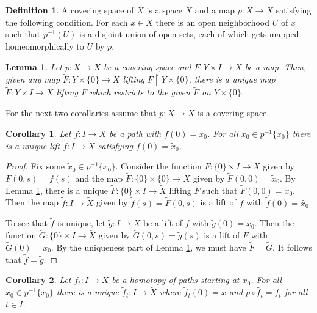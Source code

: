 \documentclass{report}
\newtheorem{lemma}{Lemma}[section]
\newtheorem{corollary}{Corollary}[section]
\theoremstyle{definition}
\newtheorem{definition}{Definition}[section]
\theoremstyle{remark}
\newcommand{\set}[1]{\{#1\}}
\begin{document}
\begin{definition}
   A covering space of $X$ is a space $\widetilde{X}$ and a map $p : \widetilde{X} \to X$ satisfying the following condition. For each $x \in X$ there is an open neighborhood $U$ of $x$ such that $p^{-1}(U)$ is a disjoint union of open sets, each of which gets mapped homeomorphically to $U$ by $p$.
\end{definition}

\begin{lemma} \label{lem_lift_of_covering}
    Let $p : \widetilde{X} \to X$ be a covering space and $F : Y \times I \to X$ be a map. Then, given any map $\widetilde{F} : Y \times \set{0} \to X$ lifting $F \restriction{Y \times \set{0}}$, there is a unique map $\widetilde{F} : Y \times I \to X$ lifting $F$ which restricts to the given $\widetilde{F}$ on $Y \times \set{0}$.
\end{lemma}

For the next two corollaries assume that $p : \tilde{X} \to X$ is a covering space.

\begin{corollary} \label{cor_lift_path}
    Let $f : I \to X$ be a path with $f(0) = x_0$. For all $\tilde{x}_0 \in p^{-1}\set{x_0}$ there is a unique lift $\tilde{f} : I \to \tilde{X}$ satisfying $\tilde{f}(0) = \tilde{x}_0$.
\end{corollary}

\begin{proof}
    Fix some $\tilde{x}_0 \in p^{-1}\set{x_0}$. Consider the function $F : \set{0} \times I \to X$ given by $F(0, s) = f(s)$ and the map $\tilde{F} : \set{0} \times \set{0} \to X$ given by $\tilde{F}(0, 0) = \tilde{x}_0$. By Lemma \ref{lem_lift_of_covering}, there is a unique $\tilde{F} : \set{0} \times I \to \tilde{X}$ lifting $F$ such that $\tilde{F}(0, 0) = \tilde{x}_0$. Then the map $\tilde{f} : I \to \tilde{X}$ given by $\tilde{f}(s) = \tilde{F}(0, s)$ is a lift of $f$ with $\tilde{f}(0) = \tilde{x_0}$.
    
    To see that $\tilde{f}$ is unique, let $\tilde{g} : I \to X$ be a lift of $f$ with $\tilde{g}(0) = \tilde{x}_0$. Then the function $\tilde{G} : \set{0} \times I \to \tilde{X}$ given by $\tilde{G}(0, s) = \tilde{g}(s)$ is a lift of $F$ with $\tilde{G}(0) = \tilde{x}_0$. By the uniqueness part of Lemma \ref{lem_lift_of_covering}, we must have $\tilde{F} = \tilde{G}$. It follows that $\tilde{f} = \tilde{g}$.
\end{proof}

\begin{corollary} \label{cor_lift_homotopy}
    Let $f_t : I \to X$ be a homotopy of paths starting at $x_0$. For all $\tilde{x}_0 \in p^{-1}\set{x_0}$ there is a unique $\tilde{f}_t : I \to \tilde{X}$ where $\tilde{f}_t(0) = \tilde{x}$ and $p \circ \tilde{f_t} = f_t$ for all $t \in I$.
\end{corollary}
\end{document}

